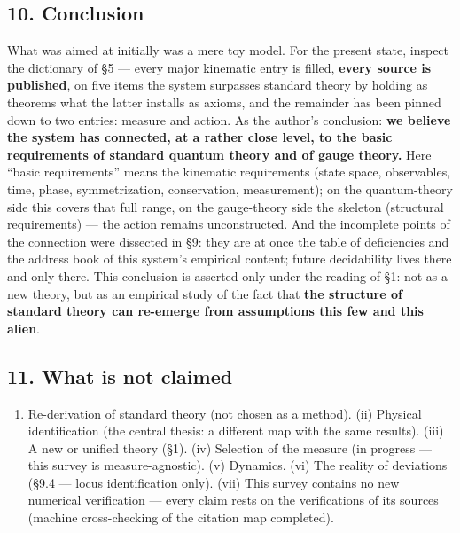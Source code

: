 \documentclass[
]{article}
\providecommand{\tightlist}{%
  \setlength{\itemsep}{0pt}\setlength{\parskip}{0pt}}
\begin{document}
\subsection{10. Conclusion}\label{conclusion}

What was aimed at initially was a mere toy model. For the present state,
inspect the dictionary of §5 --- every major kinematic entry is filled,
\textbf{every source is published}, on five items the system surpasses
standard theory by holding as theorems what the latter installs as
axioms, and the remainder has been pinned down to two entries: measure
and action. As the author's conclusion: \textbf{we believe the system
has connected, at a rather close level, to the basic requirements of
standard quantum theory and of gauge theory.} Here ``basic
requirements'' means the kinematic requirements (state space,
observables, time, phase, symmetrization, conservation, measurement); on
the quantum-theory side this covers that full range, on the gauge-theory
side the skeleton (structural requirements) --- the action remains
unconstructed. And the incomplete points of the connection were
dissected in §9: they are at once the table of deficiencies and the
address book of this system's empirical content; future decidability
lives there and only there. This conclusion is asserted only under the
reading of §1: not as a new theory, but as an empirical study of the
fact that \textbf{the structure of standard theory can re-emerge from
assumptions this few and this alien}.

\subsection{11. What is not claimed}\label{what-is-not-claimed}

\begin{enumerate}
\def\labelenumi{(\roman{enumi})}
\tightlist
\item
  Re-derivation of standard theory (not chosen as a method). (ii)
  Physical identification (the central thesis: a different map with the
  same results). (iii) A new or unified theory (§1). (iv) Selection of
  the measure (in progress --- this survey is measure-agnostic). (v)
  Dynamics. (vi) The reality of deviations (§9.4 --- locus
  identification only). (vii) This survey contains no new numerical
  verification --- every claim rests on the verifications of its sources
  (machine cross-checking of the citation map completed).
\end{enumerate}
\end{document}
